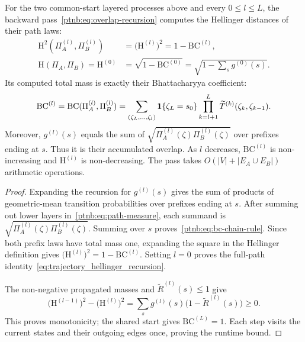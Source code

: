 \begin{theoremenv}\label{ptnb:lem:bc-chain-rule}
For the two common-start layered processes above and every $0\le l\le L$, the backward pass~\eqref{ptnb:eq:overlap-recursion} computes the Hellinger distances of their path laws:
\begin{equation}\label{eq:trajectory_hellinger_recursion}
\begin{aligned}
 \mathrm H^2(\Pi_A^{(l)},\Pi_B^{(l)})
 &=\bigl(\mathrm H^{(l)}\bigr)^2=1-\mathrm{BC}^{(l)},\\
 \mathrm H(\Pi_A,\Pi_B)=\mathrm H^{(0)}
 &=\sqrt{1-\mathrm{BC}^{(0)}}
 =\sqrt{1-\sum_sg^{(0)}(s)}.
\end{aligned}
\end{equation}
Its computed total mass is exactly their Bhattacharyya coefficient:
\begin{equation}\label{ptnb:eq:bc-chain-rule}
 \mathrm{BC}^{(l)}=\mathrm{BC}(\Pi_A^{(l)},\Pi_B^{(l)})=
 \sum_{(\zeta_L,\ldots,\zeta_l)}\mathbf{1}\{\zeta_L=s_0\}
 \prod_{k=l+1}^L\widetilde T^{(k)}(\zeta_k,\zeta_{k-1}).
\end{equation}
Moreover, $g^{(l)}(s)$ equals the sum of $\sqrt{\Pi_A^{(l)}(\zeta)\Pi_B^{(l)}(\zeta)}$ over prefixes ending at $s$. Thus it is their accumulated overlap. As $l$ decreases, $\mathrm{BC}^{(l)}$ is non-increasing and $\mathrm H^{(l)}$ is non-decreasing. The pass takes $O(|V|+|E_A\cup E_B|)$ arithmetic operations.
\end{theoremenv}
\begin{proof}
Expanding the recursion for $g^{(l)}(s)$ gives the sum of products of geometric-mean transition probabilities over prefixes ending at $s$. After summing out lower layers in~\eqref{ptnb:eq:path-measure}, each summand is $\sqrt{\Pi_A^{(l)}(\zeta)\Pi_B^{(l)}(\zeta)}$. Summing over $s$ proves~\eqref{ptnb:eq:bc-chain-rule}. Since both prefix laws have total mass one, expanding the square in the Hellinger definition gives $\bigl(\mathrm H^{(l)}\bigr)^2=1-\mathrm{BC}^{(l)}$. Setting $l=0$ proves the full-path identity~\eqref{eq:trajectory_hellinger_recursion}.

The non-negative propagated masses and $\widetilde R^{(l)}(s)\le1$ give
\[
 \bigl(\mathrm H^{(l-1)}\bigr)^2-\bigl(\mathrm H^{(l)}\bigr)^2
 =\sum_sg^{(l)}(s)\bigl(1-\widetilde R^{(l)}(s)\bigr)\ge0.
\]
This proves monotonicity; the shared start gives $\mathrm{BC}^{(L)}=1$. Each step visits the current states and their outgoing edges once, proving the runtime bound.
\end{proof}

